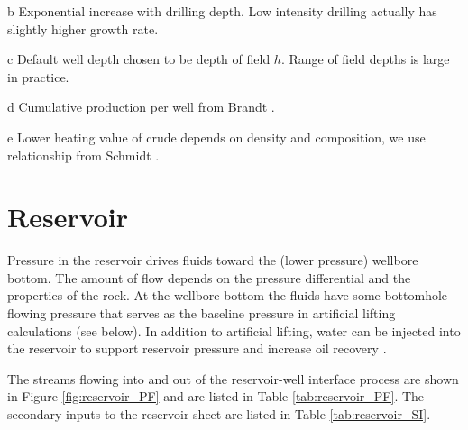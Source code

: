 \documentclass[11pt]{report}
\begin{document}
\begin{landscape}
\begin{scriptsize}
\begin{threeparttable}
\begin{tablenotes}
\item[b] Exponential increase with drilling depth. Low intensity drilling actually has slightly higher growth rate.
\item[c] Default well depth chosen to be depth of field $h$. Range of field depths is large in practice.
\item[d]Cumulative production per well from Brandt \cite{Brandt2015}. 
\item[e] Lower heating value of crude depends on density and composition, we use relationship from Schmidt \cite{Schmidt1985}.
\end{tablenotes}
\end{threeparttable}
\end{scriptsize}

\end{landscape}



\clearpage



\section {Reservoir}\label{sec:reservoir}


Pressure in the reservoir drives fluids toward the (lower pressure) wellbore bottom. The amount of flow depends on the pressure differential and the properties of the rock.  At the wellbore bottom the fluids have some bottomhole flowing pressure that serves as the baseline pressure in artificial lifting calculations (see below). In addition to artificial lifting, water can be injected into the reservoir to support reservoir pressure and increase oil recovery \cite[p. 1]{Rose1989}. 

The streams flowing into and out of the reservoir-well interface process are shown in Figure \ref{fig:reservoir_PF} and are listed in Table \ref{tab:reservoir_PF}.  
The secondary inputs to the reservoir sheet are listed in Table \ref{tab:reservoir_SI}.

\clearpage
\end{document}
